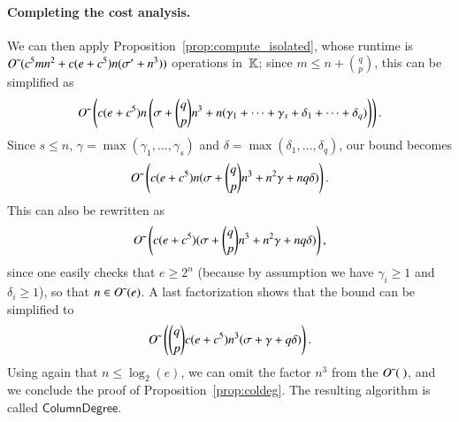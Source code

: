 \documentclass[amsthm]{elsart}
\begin{document}
\paragraph*{Completing the cost analysis.}
We can then apply Proposition~\ref{prop:compute_isolated},
whose runtime is ${O}{\,\tilde{ }\,}(c^5 m n^2  + c(e+c^5) n(\sigma' + n^3))$ operations
in~$\mathbb{K}$; since $m \le n + {q \choose p}$, this can be simplified as
$${O}{\,\tilde{ }\,}\left (c(e+c^5) n \left(\sigma + {q \choose p} n^3
+n(\gamma_1+\cdots+\gamma_s+\delta_1+\cdots+\delta_q)\right)\right).$$
Since $s \leq n$, $\gamma = \max(\gamma_1, \ldots, \gamma_s)$ and
$\delta = \max(\delta_1, \ldots, \delta_q)$, our bound becomes
$${O}{\,\tilde{ }\,}\left (c(e+c^5) n(\sigma + {q \choose p}n^3+n^2\gamma + nq
  \delta)\right).$$ This can also be rewritten as
$${O}{\,\tilde{ }\,}\left (c(e+c^5 )(\sigma + {q \choose p}n^3+n^2\gamma + nq
  \delta)\right),$$
since one easily checks that $e \ge 2^n$ (because by assumption we
have $\gamma_i\geq 1 $ and $\delta_i\geq 1$), so that
$n \in {O}{\,\tilde{ }\,}(e)$. A last factorization shows that the bound can be
simplified to
\[
  {O}{\,\tilde{ }\,}\left ({q \choose p}  c(e+c^5 )n^3(\sigma +\gamma + q
    \delta)\right).
\]
Using again  that $n\le\log_2(e)$, we can omit the factor
$n^3$ from the ${O}{\,\tilde{ }\,}(\ )$, and we conclude the proof of Proposition~\ref{prop:coldeg}.
The resulting algorithm is called $\mathsf{ColumnDegree}$.
\end{document}
